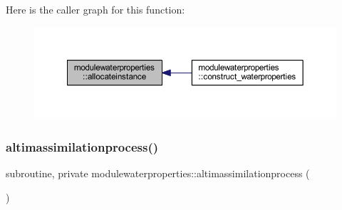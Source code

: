 Here is the caller graph for this function\+:\nopagebreak
\begin{figure}[H]
\begin{center}
\leavevmode
\includegraphics[width=350pt]{namespacemodulewaterproperties_ade36efb7389c89e5e20b885a9157f285_icgraph}
\end{center}
\end{figure}
\mbox{\label{namespacemodulewaterproperties_a372e37e94ca0415d98cc92c58dc4957b}} 
\subsubsection{\texorpdfstring{altimassimilationprocess()}{altimassimilationprocess()}}
{\footnotesize\ttfamily subroutine, private modulewaterproperties\+::altimassimilationprocess (\begin{DoxyParamCaption}{ }\end{DoxyParamCaption})\hspace{0.3cm}{\ttfamily [private]}}

